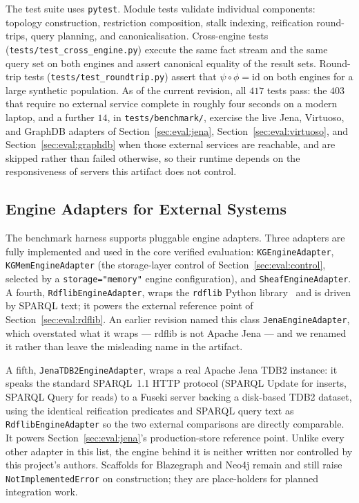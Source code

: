 The test suite uses \texttt{pytest}. Module tests validate individual
components: topology construction, restriction composition, stalk indexing,
reification round-trips, query planning, and canonicalisation. Cross-engine
tests (\texttt{tests/test\_cross\_engine.py}) execute the same fact stream
and the same query set on both engines and assert canonical equality of the
result sets. Round-trip tests (\texttt{tests/test\_roundtrip.py}) assert
that $\psi \circ \phi = \mathrm{id}$ on both engines for a large synthetic
population. As of the current revision, all $417$ tests pass: the $403$
that require no external service complete in roughly four seconds on a
modern laptop, and a further $14$, in
\texttt{tests/benchmark/}, exercise the live
Jena, Virtuoso, and GraphDB adapters of Section~\ref{sec:eval:jena},
Section~\ref{sec:eval:virtuoso}, and Section~\ref{sec:eval:graphdb} when those external services are
reachable, and are skipped rather than failed otherwise, so their
runtime depends on the responsiveness of servers this artifact does not
control.

\subsection{Engine Adapters for External Systems}
\label{sec:impl:adapters}

The benchmark harness supports pluggable engine adapters. Three adapters
are fully implemented and used in the core verified evaluation:
\texttt{KGEngineAdapter}, \texttt{KGMemEngineAdapter} (the storage-layer
control of Section~\ref{sec:eval:control}, selected by a
\texttt{storage="memory"} engine configuration), and
\texttt{SheafEngineAdapter}. A fourth, \texttt{RdflibEngineAdapter},
wraps the \texttt{rdflib} Python library~\cite{rdflib} and is driven by
SPARQL text; it powers the external reference point of
Section~\ref{sec:eval:rdflib}. An earlier revision named this class
\texttt{JenaEngineAdapter}, which overstated what it wraps --- rdflib is
not Apache Jena --- and we renamed it rather than leave the misleading
name in the artifact.

A fifth, \texttt{JenaTDB2EngineAdapter}, wraps a real Apache Jena TDB2
instance: it speaks the standard SPARQL~1.1 HTTP protocol (SPARQL Update
for inserts, SPARQL Query for reads) to a Fuseki server backing a
disk-based TDB2 dataset, using the identical reification predicates and
SPARQL query text as \texttt{RdflibEngineAdapter} so the two external
comparisons are directly comparable. It powers
Section~\ref{sec:eval:jena}'s production-store reference point. Unlike
every other adapter in this list, the engine behind it is neither
written nor controlled by this project's authors. Scaffolds for
Blazegraph and Neo4j remain and still raise
\texttt{NotImplementedError} on construction; they are place-holders for
planned integration work.
